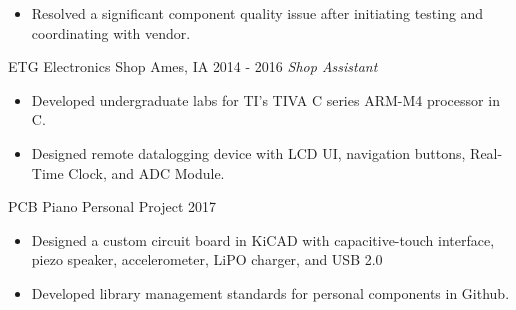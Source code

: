 \documentclass[]{bergman-cv} %
\begin{document}
\begin{entrylist}
{\begin{itemize}
	\item Resolved a significant component quality issue after initiating testing and coordinating with vendor.
\end{itemize}}
\vspace{6pt}
\entry
{ETG Electronics Shop}
{Ames, IA}
{2014 - 2016}
{\emph{Shop Assistant}}
{\begin{itemize}	\setlength\itemsep{0.25em} \vspace*{-5pt}
	\item Developed undergraduate labs for TI's TIVA C series ARM-M4 processor in C.
	\item Designed remote datalogging device with LCD UI, navigation buttons, Real-Time Clock, and ADC Module.
\end{itemize}}
\vspace{6pt}
\entryFourItem
{PCB Piano}
{Personal Project}
{2017}
{\begin{itemize}	\setlength\itemsep{0.25em} \vspace*{-5pt}
	\item Designed a custom circuit board in KiCAD with capacitive-touch interface, piezo speaker, accelerometer, LiPO charger, and USB 2.0
	\item Developed library management standards for personal components in Github.

\end{itemize}}
\end{entrylist}
\end{document}
